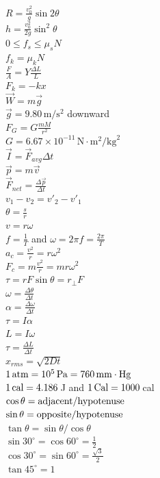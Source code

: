 \documentclass[letterpaper,addpoints,answers]{exam}
\begin{document}
\begin{multicols}{2}
 \noindent
 $R = \frac{v_0^2}{g}\sin 2\theta$ \\
 $h = \frac{v_0^2}{2 g} \sin^2 \theta$ \\
 $0 \le f_s \le \mu_s N$ \\
 $f_k = \mu_k N$ \\
 $\frac{F}{A} = Y \frac{\Delta L}{L}$ \\
 $F_k = -k x$ \\
 $\vec{W} = m \vec{g}$ \\
 $\vec{g} = 9.80\,\mbox{m}/\mbox{s}^2$ downward \\
 $F_G = G \frac{m M}{r^2}$ \\
 $G = 6.67 \times 10^{-11}\,\mbox{N}\cdot\mbox{m}^2/\mbox{kg}^2$ \\
 $\vec{I} = \vec{F}_{avg} \Delta t$ \\
 $\vec{p} = m \vec{v}$ \\
 $\vec{F}_{net} = \frac{\Delta \vec{p}}{\Delta t}$ \\
 $v_1 - v_2 = v'_2 - v'_1$ \\
 $\theta = \frac{s}{r}$ \\
 $v = r \omega$ \\
 $f = \frac{1}{T}$ and $\omega = 2 \pi f = \frac{2 \pi}{T}$ \\
 $a_c = \frac{v^2}{r} = r \omega^2$ \\
 $F_c = m\frac{v^2}{r} = m r \omega^2$ \\
 $\tau = r F \sin\theta = r_\perp F$ \\
 $\omega = \frac{\Delta \theta}{\Delta t}$ \\
 $\alpha = \frac{\Delta \omega}{\Delta t}$ \\
 $\tau = I \alpha$ \\
 $L = I \omega$ \\
 $\tau = \frac{\Delta L}{\Delta t}$ \\
 $x_{rms} = \sqrt{2 D t}$ \\
 $1\,\hbox{atm} = 10^5\,\hbox{Pa} = 760\,\hbox{mm}\cdot\hbox{Hg}$ \\
 $1\,\hbox{cal} = 4.186$\,J and $1\,\hbox{Cal} = 1000$\,cal \\ 
 $\cos\theta = \hbox{adjacent}/\hbox{hypotenuse}$ \\
 $\sin\theta = \hbox{opposite}/\hbox{hypotenuse}$ \\
 $\tan\theta = \sin\theta / \cos\theta$ \\
 $\sin 30^\circ = \cos 60^\circ = \frac{1}{2}$ \\
 $\cos 30^\circ = \sin 60^\circ = \frac{\sqrt{3}}{2}$ \\
 $\tan 45^\circ = 1$ \\
 \end{multicols}
\end{document}
